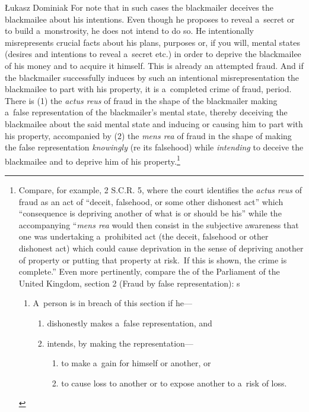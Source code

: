 \begin{artengenv}{Łukasz Dominiak}
For note that in such cases the blackmailer deceives the blackmailee about his intentions. Even though he proposes to reveal a~secret or to build a~monstrosity, he does not intend to do so. He intentionally misrepresents crucial facts about his plans, purposes or, if you will, mental states (desires and intentions to reveal a~secret etc.) in order to deprive the blackmailee of his money and to acquire it himself. This is already an attempted fraud. And if the blackmailer successfully induces by such an intentional misrepresentation the blackmailee to part with his property, it is a~completed crime of fraud, period. There is (1) the \textit{actus reus} of fraud in the shape of the blackmailer making a~false representation of the blackmailer's mental state, thereby deceiving the blackmailee about the said mental state and inducing or causing him to part with his property, accompanied by (2) the \textit{mens rea} of fraud in the shape of making the false representation \textit{knowingly} (re its falsehood) while \textit{intending} to deceive the blackmailee and to deprive him of his property.\footnote{Compare, for example, 
\parencite[][]{noauthor_regina_1993} %
 2 S.C.R. 5, where the court identifies the \textit{actus reus} of fraud as an act of ``deceit, falsehood, or some other dishonest act'' which ``consequence is depriving another of what is or should be his'' while the accompanying ``\textit{mens rea} would then consist in the subjective awareness that one was undertaking a~prohibited act (the deceit, falsehood or other dishonest act) which could cause deprivation in the sense of depriving another of property or putting that property at risk.~If this is shown, the crime is complete.'' Even more pertinently, compare the 
\parencite[][]{noauthor_fraud_nodate} %
 of the Parliament of the United Kingdom, section 2 (Fraud by false representation):
s\begin{enumerate}
\item A~person is in breach of this section if he---
\begin{enumerate}
\item dishonestly makes a~false representation, and
\item intends, by making the representation---
\begin{enumerate}
\item to make a~gain for himself or another, or
\item to cause loss to another or to expose another to a~risk of loss.

\end{enumerate}
\end{enumerate}
\end{enumerate}}
\end{artengenv}
